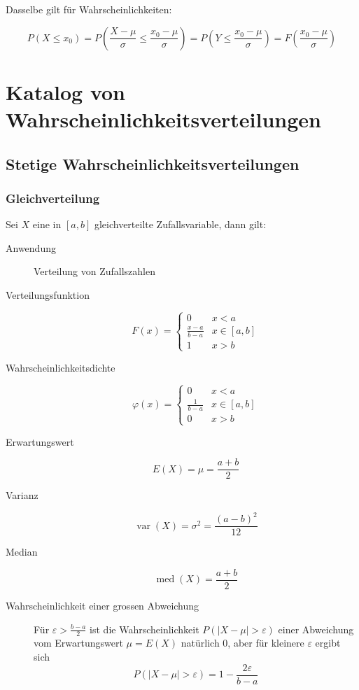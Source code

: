 Dasselbe gilt für Wahrscheinlichkeiten:

\[ P(X \leq x_0) = P\left(\frac{X-\mu}{\sigma} \leq \frac{x_0 -
\mu}{\sigma}\right) = P\left(Y \leq \frac{x_0 - \mu}{\sigma}\right) =
F\left(\frac{x_0 - \mu}{\sigma}\right) \]

\section{Katalog von Wahrscheinlichkeitsverteilungen}
\subsection{Stetige Wahrscheinlichkeitsverteilungen}
\subsubsection{Gleichverteilung}
Sei $X$ eine in $[a,b]$ gleichverteilte Zufallsvariable, dann gilt:
\begin{description}
  \item[Anwendung] Verteilung von Zufallszahlen
  \item[Verteilungsfunktion] \[F(x) = \begin{cases} 0 & x < a \\
    \frac{x-a}{b-a} & x \in [a,b] \\ 1 & x > b\end{cases}\]
  \item[Wahrscheinlichkeitsdichte] \[\varphi(x) = \begin{cases} 0 & x < a \\
    \frac{1}{b-a} & x \in [a,b] \\ 0 & x > b\end{cases}\]
  \item[Erwartungswert] \[E(X) = \mu = \frac{a+b}{2}\]
  \item[Varianz] \[\operatorname{var}(X) = \sigma^2 = \frac{(a-b)^2}{12}\]
  \item[Median] \[\operatorname{med}(X) = \frac{a+b}{2}\]
  \item[Wahrscheinlichkeit einer grossen Abweichung] Für $\varepsilon >
  \frac{b-a}{2}$ ist die Wahrscheinlichkeit $P(|X-\mu| > \varepsilon)$
    einer Abweichung vom Erwartungswert $\mu = E(X)$ natürlich 0, aber für
    kleinere $\varepsilon$ ergibt sich
    \[P(|X-\mu| > \varepsilon) = 1 - \frac{2\varepsilon}{b-a}\]
\end{description}
